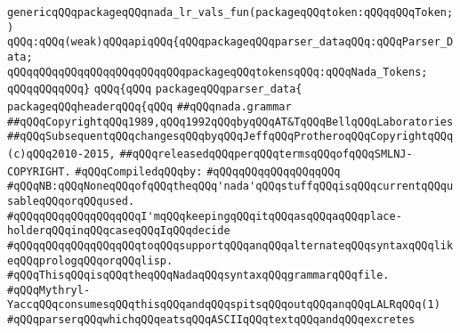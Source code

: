 \label{src/lib/compiler/front/parser/yacc/nada.grammar.pkg}
\verb|genericqQQqpackageqQQqnada_lr_vals_fun(packageqQQqtoken:qQQqqQQqToken;)|\newline
\verb|qQQq:qQQq(weak)qQQqapiqQQq{qQQqpackageqQQqparser_dataqQQq:qQQqParser_Data;|\newline
\verb|qQQqqQQqqQQqqQQqqQQqqQQqqQQqpackageqQQqtokensqQQq:qQQqNada_Tokens;|\newline
\verb|qQQqqQQqqQQq}|\newline
\verb|qQQq{qQQq|\newline
\verb|packageqQQqparser_data{|\newline
\verb|packageqQQqheaderqQQq{qQQq|\newline
\verb|##qQQqnada.grammar|\newline
\verb|##qQQqCopyrightqQQq1989,qQQq1992qQQqbyqQQqAT&TqQQqBellqQQqLaboratories|\newline
\verb|##qQQqSubsequentqQQqchangesqQQqbyqQQqJeffqQQqProtheroqQQqCopyrightqQQq(c)qQQq2010-2015,|\newline
\verb|##qQQqreleasedqQQqperqQQqtermsqQQqofqQQqSMLNJ-COPYRIGHT.|\newline
\newline
\verb|#qQQqCompiledqQQqby:|\newline
\verb|#qQQqqQQqqQQqqQQqqQQq|\newline
\newline
\verb|#qQQqNB:qQQqNoneqQQqofqQQqtheqQQq'nada'qQQqstuffqQQqisqQQqcurrentqQQqusableqQQqorqQQqused.|\newline
\verb|#qQQqqQQqqQQqqQQqqQQqI'mqQQqkeepingqQQqitqQQqasqQQqaqQQqplace-holderqQQqinqQQqcaseqQQqIqQQqdecide|\newline
\verb|#qQQqqQQqqQQqqQQqqQQqtoqQQqsupportqQQqanqQQqalternateqQQqsyntaxqQQqlikeqQQqprologqQQqorqQQqlisp.|\newline
\newline
\newline
\newline
\newline
\newline
\verb|#qQQqThisqQQqisqQQqtheqQQqNadaqQQqsyntaxqQQqgrammarqQQqfile.|\newline
\verb|#qQQqMythryl-YaccqQQqconsumesqQQqthisqQQqandqQQqspitsqQQqoutqQQqanqQQqLALRqQQq(1)|\newline
\verb|#qQQqparserqQQqwhichqQQqeatsqQQqASCIIqQQqtextqQQqandqQQqexcretes|\newline
